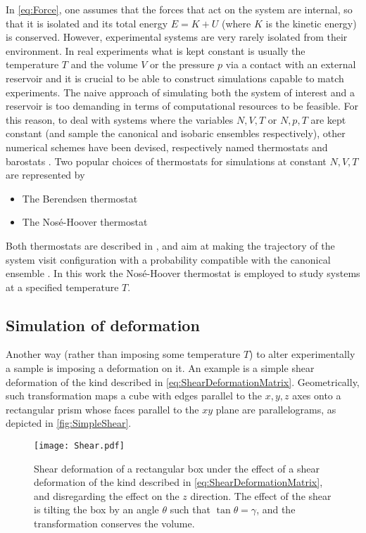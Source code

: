 In \autoref{eq:Force}, one assumes that the forces that act on the system are internal, so that it is isolated and its total energy $E = K + U$ (where $K$ is the kinetic energy) is conserved. However, experimental systems are very rarely isolated from their environment. In real experiments what is kept constant is usually the temperature $T$ and the volume $V$ or the pressure $p$ via a contact with an external reservoir and it is crucial to be able to construct simulations capable to match experiments. The naive approach of simulating both the system of interest and a reservoir is too demanding in terms of computational resources to be feasible. For this reason, to deal with systems where the variables $N, V, T$ or $N, p, T$ are kept constant (and sample the canonical and isobaric ensembles respectively), other numerical schemes have been devised, respectively named thermostats and barostats \cite{frenkel2001understanding}. Two popular choices of thermostats for simulations at constant $N, V, T$ are represented by
\begin{itemize}
	\item The Berendsen thermostat
	\item The Nos\'e-Hoover thermostat 
\end{itemize}
Both thermostats are described in \cite{hunenberger2005thermostat}, and aim at making the trajectory of the system visit configuration with a probability compatible with the canonical ensemble \cite{frenkel2001understanding}. In this work the Nos\'e-Hoover thermostat is employed to study systems at a specified temperature $T$.	

\subsection{Simulation of deformation}
Another way (rather than imposing some temperature $T$) to alter experimentally a sample is imposing a deformation on it. An example is a simple shear deformation of the kind described in \autoref{eq:ShearDeformationMatrix}.
Geometrically, such transformation maps a cube with edges parallel to the $x, y, z$ axes onto a rectangular prism whose faces parallel to the $xy$ plane are parallelograms, as depicted in \autoref{fig:SimpleShear}. 

\begin{figure}[!h] 
\centering 
\texttt{[image: Shear.pdf]} 
\caption{Shear deformation of a rectangular box under the effect of a shear deformation of the kind described in \autoref{eq:ShearDeformationMatrix}, and disregarding the effect on the $z$ direction. The effect of the shear is tilting the box by an angle $\theta$ such that $\tan \theta = \gamma$, and the transformation conserves the volume. \label{fig:SimpleShear}}
\end{figure}

